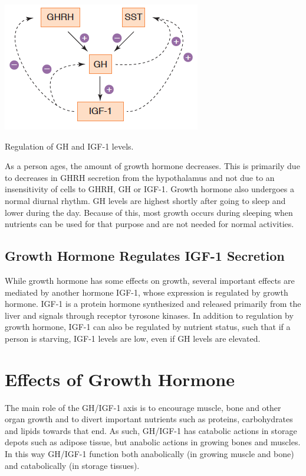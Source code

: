 \documentclass{tufte-handout}
\begin{document}
\begin{marginfigure}
  \includegraphics{figures/gh-igf1}
  \caption{Regulation of GH and IGF-1 levels.}
    \label{fig:gh-igf1}
\end{marginfigure}

  As a person ages, the amount of growth hormone decreases.  This is primarily due to decreases in GHRH secretion from the hypothalamus and not due to an insensitivity of cells to GHRH, GH or IGF-1.  Growth hormone also undergoes a normal diurnal rhythm.  GH levels are highest shortly after going to sleep and lower during the day.  Because of this, most growth occurs during sleeping when nutrients can be used for that purpose and are not needed for normal activities.

\subsection{Growth Hormone Regulates IGF-1 Secretion}

While growth hormone has some effects on growth, several important effects are mediated by another hormone IGF-1, whose expression is regulated by growth hormone.  IGF-1 is a protein hormone synthesized and released primarily from the liver and signals through receptor tyrosone kinases.  In addition to regulation by growth hormone, IGF-1 can also be regulated by nutrient status, such that if a person is starving, IGF-1 levels are low, even if GH levels are elevated.


\section{Effects of Growth Hormone}

The main role of the GH/IGF-1 axis is to encourage muscle, bone and other organ growth and to divert important nutrients such as proteins, carbohydrates and lipids towards that end.  As such, GH/IGF-1 has catabolic actions in storage depots such as adipose tissue, but anabolic actions in growing bones and muscles.  In this way GH/IGF-1 function both anabolically (in growing muscle and bone) and catabolically (in storage tissues).
\end{document}
